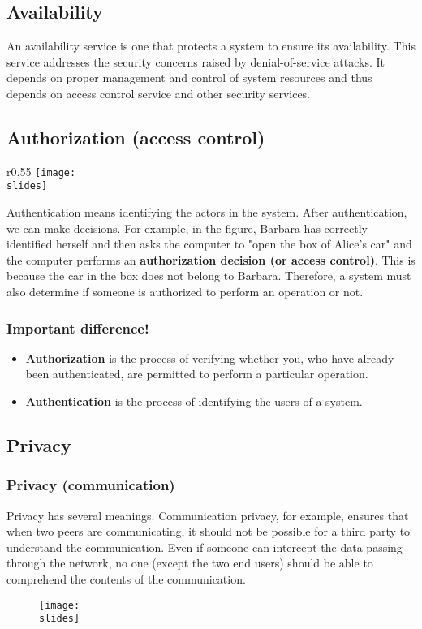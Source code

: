 \subsection{Availability}
An availability service is one that protects a system to ensure its availability. This service addresses the security
concerns raised by denial-of-service attacks. It depends on proper management and control of system resources
and thus depends on access control service and other security services.


\subsection{Authorization (access control)}
\begin{wrapfigure}{r}{0.55\textwidth}
  \centering
  \texttt{[image: \\slides]}
\end{wrapfigure}
Authentication means identifying the actors in the system. After authentication, we can make decisions. For example, in the figure, Barbara has correctly identified herself and then asks the computer to "open the box of Alice's car" and the computer performs an \textbf{authorization decision (or access control)}. This is because the car in the box does not belong to Barbara. Therefore, a system must also determine if someone is authorized to perform an operation or not.

\subsubsection*{Important difference!}
\begin{itemize}
  \item \textbf{Authorization} is the process of verifying whether you, who have already been authenticated, are permitted to perform a particular operation.
  \item \textbf{Authentication} is the process of identifying the users of a system.
\end{itemize}


\subsection{Privacy}
\subsubsection*{Privacy (communication)}
Privacy has several meanings.
Communication privacy, for example, ensures that when two peers are communicating, it should not be possible for a third party to understand the communication.
Even if someone can intercept the data passing through the network, no one (except the two end users) should be able to comprehend the contents of the communication.
\begin{figure}[h]
  \centering
  \texttt{[image: \\slides]}
\end{figure}

